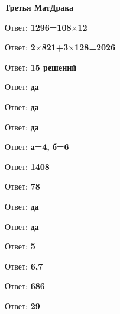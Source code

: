 \centerline{\bf \Huge Третья МатДрака}

 Ответ: \textbf{1296=108$\times$12}

 Ответ: \textbf{2$\times$821+3$\times$128=2026}

 Ответ: \textbf{15 решений}

 Ответ: \textbf{да}

 Ответ: \textbf{да}

 Ответ: \textbf{да}

 Ответ: \textbf{а=4, б=6}

 Ответ: \textbf{1408}

 Ответ: \textbf{78}

 Ответ: \textbf{да}

 Ответ: \textbf{да}

 Ответ: \textbf{5}

 Ответ: \textbf{6,7}

 Ответ: \textbf{686}

 Ответ: \textbf{29}

